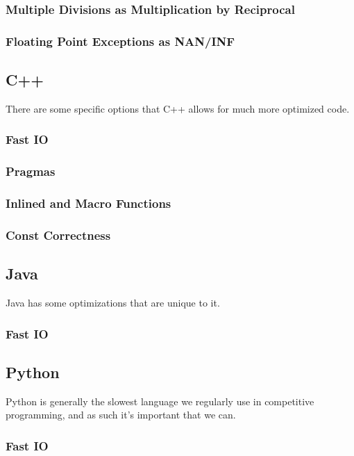 \subsubsection{Multiple Divisions as Multiplication by Reciprocal}

\subsubsection{Floating Point Exceptions as NAN/INF}

\subsection{C++}

There are some specific options that C++ allows for much more optimized code.

\subsubsection{Fast IO}

\subsubsection{Pragmas}

\subsubsection{Inlined and Macro Functions}

\subsubsection{Const Correctness}

\subsection{Java}

Java has some optimizations that are unique to it.

\subsubsection{Fast IO}

\subsection{Python}

Python is generally the slowest language we regularly use in competitive programming, and as such it's important that we can. 

\subsubsection{Fast IO}

